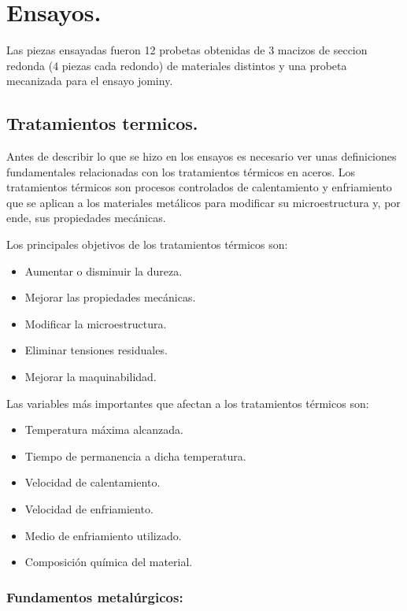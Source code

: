 \documentclass[12pt,a4paper]{article}
\begin{document}
\section{Ensayos.}

Las piezas ensayadas fueron 12 probetas obtenidas de 3 macizos de seccion redonda (4 piezas cada redondo) de materiales distintos y una probeta mecanizada para el ensayo jominy.

\subsection{Tratamientos termicos.}

Antes de describir lo que se hizo en los ensayos es necesario ver unas definiciones fundamentales relacionadas con los tratamientos térmicos en aceros. Los tratamientos térmicos son procesos controlados de calentamiento y enfriamiento que se aplican a los materiales metálicos para modificar su microestructura y, por ende, sus propiedades mecánicas.

Los principales objetivos de los tratamientos térmicos son:

\begin{itemize}
    \item Aumentar o disminuir la dureza.
    \item Mejorar las propiedades mecánicas.
    \item Modificar la microestructura.
    \item Eliminar tensiones residuales.
    \item Mejorar la maquinabilidad.
\end{itemize}

Las variables más importantes que afectan a los tratamientos térmicos son:

\begin{itemize}
    \item Temperatura máxima alcanzada.
    \item Tiempo de permanencia a dicha temperatura.
    \item Velocidad de calentamiento.
    \item Velocidad de enfriamiento.
    \item Medio de enfriamiento utilizado.
    \item Composición química del material.
\end{itemize}

\subsubsection{Fundamentos metalúrgicos:}
\end{document}
